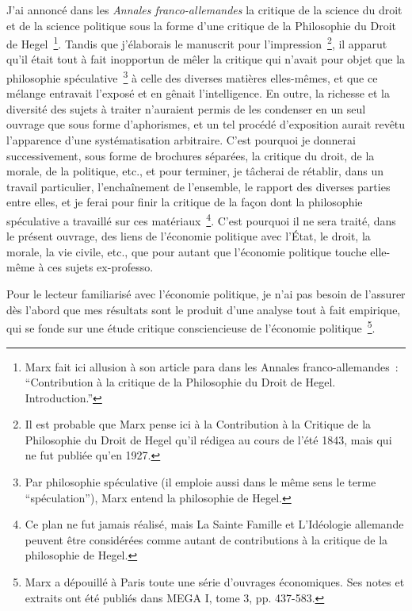 \documentclass[french,twoside]{book} %
\begin{document}
\bigbreak
\noindent J’ai annoncé dans les \emph{Annales franco-allemandes} la critique de la science du droit et de la science politique sous la forme d’une critique de la Philosophie du Droit de Hegel \footnote{Marx fait ici allusion à son article para dans les Annales franco-allemandes : “Contribution à la critique de la Philosophie du Droit de Hegel. Introduction.”}. Tandis que j’élaborais le manuscrit pour l’impression \footnote{Il est probable que Marx pense ici à la Contribution à la Critique de la Philosophie du Droit de Hegel qu’il rédigea au cours de l’été 1843, mais qui ne fut publiée qu’en 1927.}, il apparut qu’il était tout à fait inopportun de mêler la critique qui n’avait pour objet que la philosophie spéculative \footnote{Par philosophie spéculative (il emploie aussi dans le même sens le terme “spéculation”), Marx entend la philosophie de Hegel.} à celle des diverses matières elles-mêmes, et que ce mélange entravait l’exposé et en gênait l’intelligence. En outre, la richesse et la diversité des sujets à traiter n’auraient permis de les condenser en un seul ouvrage que sous forme d’aphorismes, et un tel procédé d’exposition aurait revêtu l’apparence d’une systématisation arbitraire. C’est pourquoi je donnerai successivement, sous forme de brochures séparées, la critique du droit, de la morale, de la politique, etc., et pour terminer, je tâcherai de rétablir, dans un travail particulier, l’enchaînement de l’ensemble, le rapport des diverses parties entre elles, et je ferai pour finir la critique de la façon dont la philosophie spéculative a travaillé sur ces matériaux \footnote{Ce plan ne fut jamais réalisé, mais La Sainte Famille et L’Idéologie allemande peuvent être considérées comme autant de contributions à la critique de la philosophie de Hegel.}. C’est pourquoi il ne sera traité, dans le présent ouvrage, des liens de l’économie politique avec l’État, le droit, la morale, la vie civile, etc., que pour autant que l’économie politique touche elle-même à ces sujets ex-professo.\par
Pour le lecteur familiarisé avec l’économie politique, je n’ai pas besoin de l’assurer dès l’abord que mes résultats sont le produit d’une analyse tout à fait empirique, qui se fonde sur une étude critique consciencieuse de l’économie politique \footnote{Marx a dépouillé à Paris toute une série d’ouvrages économiques. Ses notes et extraits ont été publiés dans MEGA I, tome 3, pp. 437-583.}.\par
\end{document}
